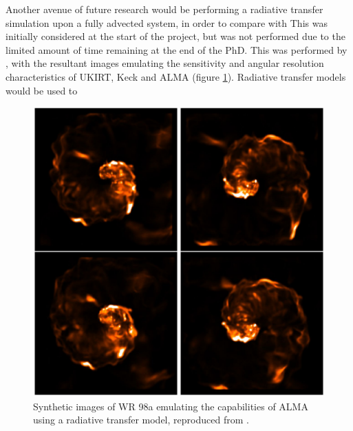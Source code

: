 
Another avenue of future research would be performing a radiative transfer simulation upon a fully advected system, in order to compare with 
This was initially considered at the start of the project, but was not performed due to the limited amount of time remaining at the end of the PhD.
This was performed by \textcite{hendrix_pinwheels_2016}, with the resultant images emulating the sensitivity and angular resolution characteristics of UKIRT, Keck and ALMA (figure \ref{fig:hendrix-synthetic}).
Radiative transfer models would be used to 

\begin{figure}
  \centering
  \includegraphics{assets/hendrix-synthetic-observation.jpeg}
  \caption[\textcite{hendrix_pinwheels_2016} synthetic astronomy]{Synthetic images of WR 98a emulating the capabilities of ALMA using a radiative transfer model, reproduced from \textcite{hendrix_pinwheels_2016}.}
  \label{fig:hendrix-synthetic}
\end{figure}
